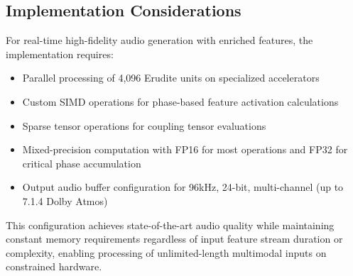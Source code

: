 \subsection{Implementation Considerations}

For real-time high-fidelity audio generation with enriched features, the implementation requires:

\begin{itemize}
    \item Parallel processing of 4,096 Erudite units on specialized accelerators
    \item Custom SIMD operations for phase-based feature activation calculations
    \item Sparse tensor operations for coupling tensor evaluations
    \item Mixed-precision computation with FP16 for most operations and FP32 for critical phase accumulation
    \item Output audio buffer configuration for 96kHz, 24-bit, multi-channel (up to 7.1.4 Dolby Atmos)
\end{itemize}

This configuration achieves state-of-the-art audio quality while maintaining constant memory requirements regardless of input feature stream duration or complexity, enabling processing of unlimited-length multimodal inputs on constrained hardware.